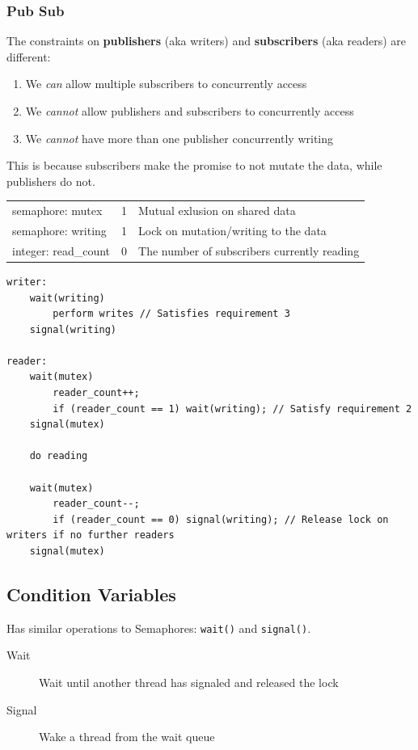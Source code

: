 \documentclass[a4]{article}
\begin{document}
\subsubsection{Pub Sub}\label{pub-sub}

The constraints on \textbf{publishers} (aka writers) and
\textbf{subscribers} (aka readers) are different:

\begin{enumerate}
\item
  We \emph{can} allow multiple subscribers to concurrently access
\item
  We \emph{cannot} allow publishers and subscribers to concurrently
  access
\item
  We \emph{cannot} have more than one publisher concurrently writing
\end{enumerate}

This is because subscribers make the promise to not mutate the data,
while publishers do not.

\begin{tabular}{l | c | l }
semaphore: mutex     & 1 & Mutual exlusion on shared data\\
semaphore: writing   & 1 & Lock on mutation/writing to the data\\
integer: read\_count & 0 & The number of subscribers currently reading
\end{tabular}

\begin{verbatim}
writer:
    wait(writing)
        perform writes // Satisfies requirement 3
    signal(writing)
    
reader:
    wait(mutex)
        reader_count++;
        if (reader_count == 1) wait(writing); // Satisfy requirement 2
    signal(mutex)
    
    do reading
    
    wait(mutex)
        reader_count--;
        if (reader_count == 0) signal(writing); // Release lock on writers if no further readers
    signal(mutex)
\end{verbatim}

\subsection{Condition Variables}

Has similar operations to Semaphores: \texttt{wait()} and \texttt{signal()}.

\begin{description}
  \item[Wait] Wait until another thread has signaled and released the lock
  \item[Signal] Wake a thread from the wait queue
\end{description}
\end{document}
